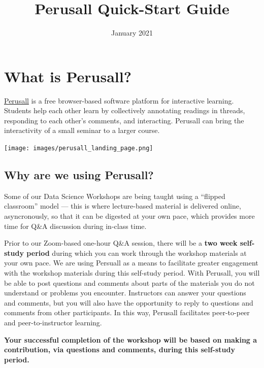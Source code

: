 \documentclass[]{book}
\title{Perusall Quick-Start Guide}
\author{}
\date{\vspace{-2.5em}January 2021}
\begin{document}
\maketitle

{
\setcounter{tocdepth}{1}
\tableofcontents
}
\hypertarget{what-is-perusall}{%
\chapter*{What is Perusall?}\label{what-is-perusall}}

\href{https://perusall.com/}{Perusall} is a free browser-based software platform for interactive learning. Students help each other learn by collectively annotating readings in threads, responding to each other's comments, and interacting. Perusall can bring the interactivity of a small seminar to a larger course.

\texttt{[image: images/perusall\_landing\_page.png]}

\hypertarget{why-are-we-using-perusall}{%
\section*{Why are we using Perusall?}\label{why-are-we-using-perusall}}

Some of our Data Science Workshops are being taught using a ``flipped classroom'' model --- this is where lecture-based material is delivered online, asyncronously, so that it can be digested at your own pace, which provides more time for Q\&A discussion during in-class time.

Prior to our Zoom-based one-hour Q\&A session, there will be a \textbf{two week self-study period} during which you can work through the workshop materials at your own pace. We are using Persuall as a means to facilitate greater engagement with the workshop materials during this self-study period. With Perusall, you will be able to post questions and comments about parts of the materials you do not understand or problems you encounter. Instructors can answer your questions and comments, but you will also have the opportunity to reply to questions and comments from other participants. In this way, Perusall facilitates peer-to-peer and peer-to-instructor learning.

\textbf{Your successful completion of the workshop will be based on making a contribution, via questions and comments, during this self-study period.}
\end{document}

